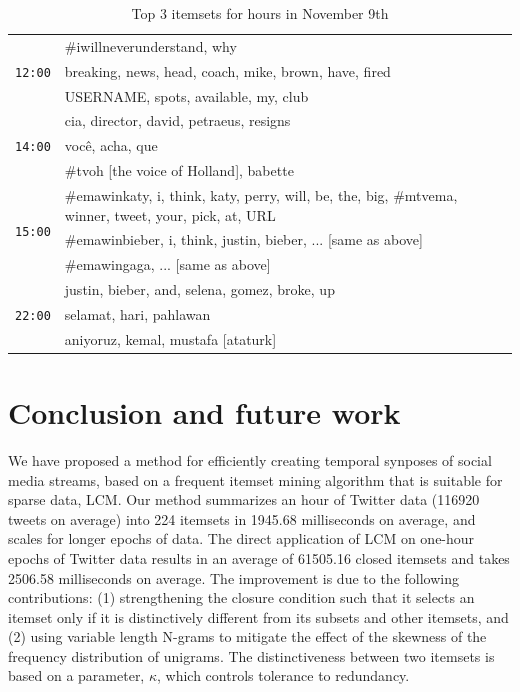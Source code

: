 \documentclass[letterpaper,12pt,titlepage,oneside,final]{book}
\begin{document}
\begin{table}
\begin{center}
\small
\def\arraystretch{1.1}
\begin{tabular}{|p{.6cm}|p{7.5cm}|}

\hline
\multirow{3}{*}{\texttt{12:00}} 
& \#iwillneverunderstand, why\\\cline{2-2}
& breaking, news, head, coach, mike, brown, have, fired  \\\cline{2-2}
& USERNAME, spots, available, my, club \\\hline
\multirow{3}{*}{\texttt{14:00}} 
& cia, director, david, petraeus, resigns \\\cline{2-2}
& voc\^{e}, acha, que \\\cline{2-2}
& \#tvoh [the voice of Holland], babette \\\hline
\multirow{3}{*}{\texttt{15:00}} & \#emawinkaty, i, think, katy, perry, will, be, the, big,  \#mtvema, winner, tweet, your, pick, at, URL
\\ \cline{2-2}
& \#emawinbieber, i, think, justin, bieber, ... [same as above] \\ \cline{2-2}
& \#emawingaga, ... [same as above]  \\\hline														
\multirow{3}{*}{\texttt{22:00}} & justin, bieber, and, selena, gomez, broke, up
\\ \cline{2-2}
& selamat, hari, pahlawan \\\cline{2-2}
& aniyoruz, kemal, mustafa [ataturk] \\ \hline
\end{tabular}
\end{center}
\caption{Top 3 itemsets for hours in November 9th}
 \label{table:nov9}
\end{table}




\chapter{Conclusion and future work}
\label{sec:concfut}
We have proposed a method for efficiently creating temporal synposes of social
media streams, based on a frequent itemset mining algorithm that is suitable
for sparse data, LCM.
Our method summarizes an hour of Twitter data (116920 tweets on average) into
224 itemsets in 1945.68 milliseconds on average,
and scales for longer epochs of data.
The direct application of LCM on one-hour epochs of Twitter data results in
an average of 61505.16 closed itemsets and takes 2506.58 milliseconds on
average.
The improvement is due to the following contributions: 
(1) strengthening  the closure condition such that it selects an itemset only if
it is distinctively different from its subsets and other itemsets, and 
(2) using variable length N-grams to mitigate the effect
of the skewness of the frequency distribution of unigrams.
The distinctiveness between two itemsets is based on a parameter, $\kappa$, which controls tolerance to redundancy. %
\end{document}
